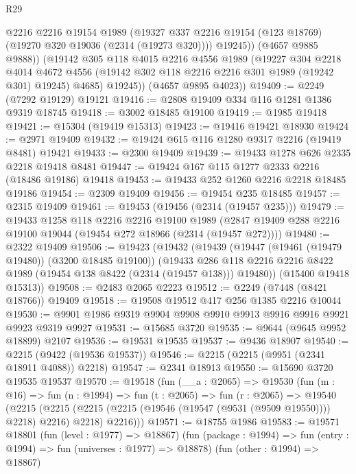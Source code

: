 \begin{lexlean}{R29}
\begin{coremodule}
              @2216
              @2216
              @19154
              @1989
              (@19327 @337 @2216 @19154 (@123 @18769) (@19270 @320 @19036 (@2314 (@19273 @320))))
              @19245))
          (@4657 @9885 @9888))
        (@19142
          @305
          @118
          @4015
          @2216
          @4556
          @1989
          (@19227
            @304
            @2218
            @4014
            @4672
            @4556
            (@19142 @302 @118 @2216 @2216 @301 @1989 (@19242 @301) @19245)
            @4685)
          @19245))
      (@4657 @9895 @4023))
@19409 := @2249 (@7292 @19129) @19121
@19416 := @2808 @19409 @334 @116 @1281 @1386 @9319 @18745
@19418 := @3002 @18485 @19100
@19419 := @1985 @19418
@19421 := @15304 (@19419 @15313)
@19423 := @19416 @19421 @18930
@19424 := @2971 @19409
@19432 := @19424 @615 @116 @1280 @9317 @2216 (@19419 @8481) @19421
@19433 := @2300 @19409
@19439 := @19433 @1278 @626 @2335 @2218 @19418 @8481
@19447 := @19424 @167 @115 @1277 @2333 @2216 (@18486 @19186) @19418
@19453 := @19433 @252 @1260 @2216 @2218 @18485 @19186
@19454 := @2309 @19409
@19456 := @19454 @235 @18485
@19457 := @2315 @19409
@19461 := @19453 (@19456 (@2314 (@19457 @235)))
@19479 := @19433
    @1258
    @118
    @2216
    @2216
    @19100
    @1989
    (@2847 @19409 @288 @2216 @19100 @19044 (@19454 @272 @18966 (@2314 (@19457 @272))))
@19480 := @2322 @19409
@19506 := @19423
    (@19432
      (@19439
        (@19447 (@19461 (@19479 @19480)) (@3200 @18485 @19100))
        (@19433 @286 @118 @2216 @2216 @8422 @1989 (@19454 @138 @8422 (@2314 (@19457 @138))) @19480))
      (@15400 @19418 @15313))
@19508 := @2483 @2065 @2223
@19512 := @2249 (@7448 (@8421 @18766)) @19409
@19518 := @19508 @19512 @417 @256 @1385 @2216 @10044
@19530 := @9901 @1986 @9319 @9904 @9908 @9910 @9913 @9916 @9916 @9921 @9923 @9319 @9927
@19531 := @15685 @3720
@19535 := @9644 (@9645 @9952 @18899) @2107
@19536 := @19531 @19535
@19537 := @9436 @18907
@19540 := @2215 (@9422 (@19536 @19537))
@19546 := @2215 (@2215 (@9951 (@2341 @18911 @4088)) @2218)
@19547 := @2341 @18913
@19550 := @15690 @3720 @19535 @19537
@19570 := @19518
    (fun (__a : @2065) =>
    @19530
      (fun (m : @16) =>
      fun (n : @1994) =>
      fun (t : @2065) =>
      fun (r : @2065) =>
      @19540
        (@2215
          (@2215 (@2215 (@2215 (@19546 (@19547 (@9531 (@9509 @19550)))) @2218) @2216) @2218)
          @2216)))
@19571 := @18755 @1986
@19583 := @19571
    @18801
    (fun (level : @1977) => @18867)
    (fun (package : @1994) => fun (entry : @1994) => fun (universes : @1977) => @18878)
    (fun (other : @1994) => @18867)

\end{coremodule}
\end{lexlean}
